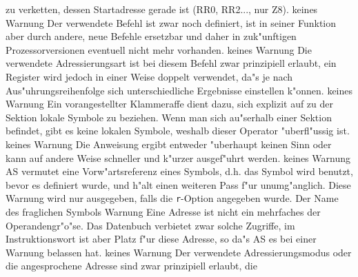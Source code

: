 \documentclass[12pt,a4paper,twoside]{report}
\newcommand{\tty}[1]{{\tt #1}}
\newcommand{\asname}{AS}
\begin{document}
\begin{description}
{                zu verketten, dessen Startadresse gerade ist (RR0, RR2...,
                nur Z8).}
               {keines}
               {Warnung}
               {Der verwendete Befehl ist zwar noch
                definiert, ist in seiner Funktion aber durch andere,
                neue Befehle ersetzbar und daher in zuk"unftigen
                Prozessorversionen eventuell nicht mehr vorhanden.}
               {keines}
               {Warnung}
               {Die verwendete Adressierungsart ist bei
                diesem Befehl zwar prinzipiell erlaubt, ein Register
                wird jedoch in einer Weise doppelt verwendet, da"s je
                nach Aus"uhrungsreihenfolge sich unterschiedliche
                Ergebnisse einstellen k"onnen.}
               {keines}
               {Warnung}
               {Ein vorangestellter Klammeraffe dient
                dazu, sich explizit auf zu der Sektion lokale Symbole
                zu beziehen.  Wenn man sich au"serhalb einer Sektion
                befindet, gibt es keine lokalen Symbole, weshalb dieser
                Operator "uberfl"ussig ist.}
               {keines}
               {Warnung}
               {Die Anweisung ergibt entweder "uberhaupt
                keinen Sinn oder kann auf andere Weise schneller und k"urzer
                ausgef"uhrt werden.}
               {keines}
               {Warnung}
               {\asname{} vermutet eine Vorw"artsreferenz eines
                Symbols, d.h. das Symbol wird benutzt, bevor es definiert
                wurde, und h"alt einen weiteren Pass f"ur unumg"anglich.
                Diese Warnung wird nur ausgegeben, falls die \tty{r}-Option
                angegeben wurde.}
               {Der Name des fraglichen Symbols}
               {Warnung}
               {Eine Adresse ist nicht ein mehrfaches der
                Operandengr"o"se.  Das Datenbuch verbietet zwar solche Zugriffe,
                im Instruktionswort ist aber Platz f"ur diese Adresse, so da"s
                \asname{} es bei einer Warnung belassen hat.}
               {keines}
               {Warnung}
               {Der verwendete Adressierungsmodus oder die
                angesprochene Adresse sind zwar prinzipiell erlaubt, die
}
\end{description}
\end{document}
